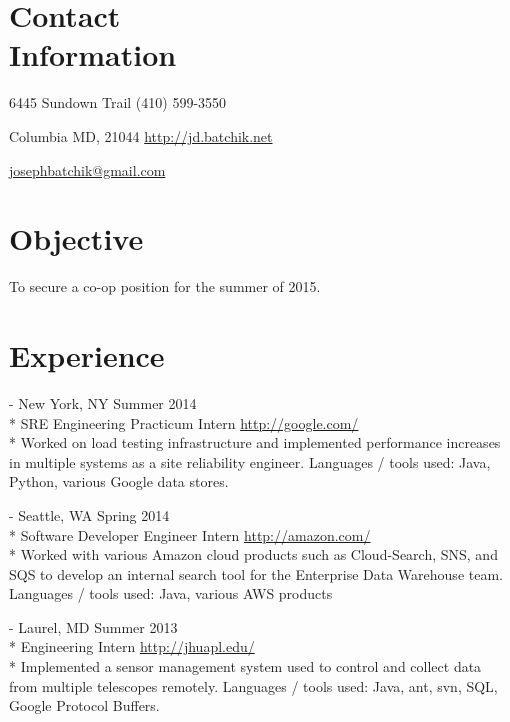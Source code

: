 \documentclass[a4paper,margin,line]{resume}
\newcommand{\rurl}[1]{\hfill {\footnotesize \url{#1}}}
\newcommand{\rdate}[1]{\hfill {\small #1}}
\renewcommand{\employer}[5]{\item[#1] - #2 \rdate{#3} \\* #4 \rurl{#5} \\*}
\begin{document}
\begin{resume}
\section{\mysidestyle Contact \\ Information} \vspace{2mm}
	\begin{asparablank}
    \item 6445 Sundown Trail  \hfill (410) 599-3550
		\item Columbia MD, 21044 \hfill \href{http://jd.batchik.net/}{http://jd.batchik.net}
		\item  \hfill \href{mailto:josephbatchik@gmail.com}{josephbatchik@gmail.com}
	\end{asparablank}

\section{\mysidestyle Objective}
	To secure a co-op position for the summer of 2015.

\section{\mysidestyle Experience}
	\begin{asparadesc}
        \employer{Google}{New York, NY}{Summer 2014}{SRE Engineering Practicum Intern}
        {http://google.com/}
		\small
        Worked on load testing infrastructure and implemented performance increases 
        in multiple systems as a site reliability engineer. Languages / tools used: 
        Java, Python, various Google data stores.
		\normalsize
		\\
		\employer{Amazon}{Seattle, WA}{Spring 2014}{Software Developer Engineer Intern}
        {http://amazon.com/}
		\small
	    Worked with various Amazon cloud products such as Cloud-Search, SNS, and SQS 
        to develop an internal search tool for the Enterprise Data Warehouse team. 
        Languages / tools used: Java, various AWS products
        \normalsize
		\\
		\employer{John Hopkins University Applied Physics Lab}{Laurel, MD}
        {Summer 2013}{Engineering Intern}{http://jhuapl.edu/}
		\small
		Implemented a sensor management system used to control and collect data from 
        multiple telescopes remotely. Languages / tools used: Java, ant, svn, SQL, 
        Google Protocol Buffers.
        \normalsize
		\end{asparadesc}


\end{resume}
\end{document}
